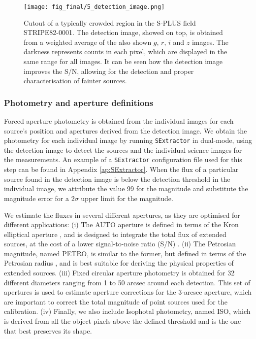 \documentclass[fleqn,usenatbib]{mnras}
\begin{document}
\begin{figure}
\begin{center}
\texttt{[image: fig\_final/5\_detection\_image.png]}
\caption{\label{fig:detection_image}Cutout of a typically crowded region in the S-PLUS field STRIPE82-0001. The detection image, showed on top, is obtained from a weighted average of the also shown $g$, $r$, $i$ and $z$ images. The darkness represents counts in each pixel, which are displayed in the same range for all images. It can be seen how the detection image improves the S/N, allowing for the detection and proper characterisation of fainter sources.}
\end{center}
\end{figure}

\subsubsection{Photometry and aperture definitions}

Forced aperture photometry is obtained from the individual images for each source's position and apertures derived from the detection image. We obtain the photometry for each individual image by running \texttt{SExtractor} in dual-mode, using the detection image to detect the sources and the individual science images for the measurements. An example of a \texttt{SExtractor} configuration file used for this step can be found in Appendix \ref{ap:SExtractor}. When the flux of a particular source found in the detection image is below the detection threshold in the individual image, we attribute the value 99 for the magnitude and substitute the magnitude error for a $2\sigma$ upper limit for the magnitude. 

We estimate the fluxes in several different apertures, as they are optimised for different applications: (i) The AUTO aperture is defined in terms of the Kron elliptical aperture \citep{Kron1980}, and is designed to integrate the total flux of extended sources, at the cost of a lower signal-to-noise ratio (S/N) . (ii) The Petrosian  magnitude, named PETRO, is similar to the former, but defined in terms of the Petrosian radius \citep{Petrosian1976}, and is best suitable for deriving the physical properties of extended sources. (iii) Fixed circular aperture photometry is obtained for 32 different diameters ranging from 1 to 50 arcsec around each detection. This set of apertures is used to estimate aperture corrections for the 3-arcsec aperture, which are important to correct the total magnitude of point sources used for the calibration. (iv) Finally, we also include Isophotal photometry, named ISO, which is derived from all the object pixels above the defined threshold and is the one that best preserves its shape. 
\end{document}
